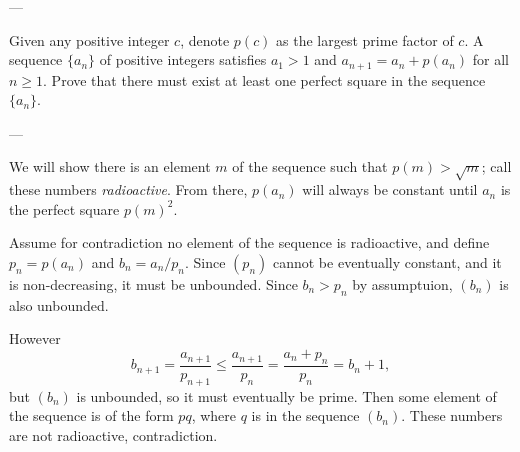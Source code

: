 
---

Given any positive integer $c$, denote $p(c)$ as the largest prime factor of $c$. A sequence $\{a_n\}$ of positive integers satisfies $a_1>1$ and $a_{n+1}=a_n+p(a_n)$ for all $n\ge1$. Prove that there must exist at least one perfect square in the sequence $\{a_n\}$.

---

We will show there is an element $m$ of the sequence such that $p(m)>\sqrt m$; call these numbers \emph{radioactive}. From there, $p(a_n)$ will always be constant until $a_n$ is the perfect square $p(m)^2$.

Assume for contradiction no element of the sequence is radioactive, and define $p_n=p(a_n)$ and $b_n=a_n/p_n$. Since $(p_n)$ cannot be eventually constant, and it is non-decreasing, it must be unbounded. Since $b_n>p_n$ by assumptuion, $(b_n)$ is also unbounded.

However \[b_{n+1}=\frac{a_{n+1}}{p_{n+1}}\le\frac{a_{n+1}}{p_n}=\frac{a_n+p_n}{p_n}=b_n+1,\]
but $(b_n)$ is unbounded, so it must eventually be prime. Then some element of the sequence is of the form $pq$, where $q$ is in the sequence $(b_n)$. These numbers are not radioactive, contradiction.

